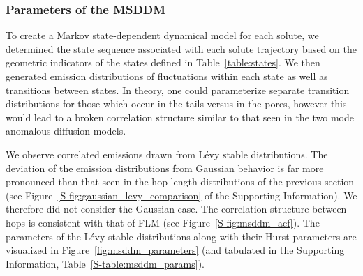 \documentclass[journal=jctcce,manuscript=article]{achemso}
\begin{document}
  \subsubsection{Parameters of the MSDDM}\label{section:msddm_parameterization}

  To create a Markov state-dependent dynamical model for each solute, we determined
  the state sequence associated with each solute trajectory based on the geometric 
  indicators of the states defined in Table~\ref{table:states}. We then generated
  emission distributions of fluctuations within each state as well as transitions 
  between states. In theory, one could parameterize separate transition distributions
  for those which occur in the tails versus in the pores, however this would lead to
  a broken correlation structure similar to that seen in the two mode anomalous
  diffusion models.

  We observe correlated emissions drawn from L\'evy stable distributions. The
  deviation of the emission distributions from Gaussian behavior is far more
  pronounced than that seen in the hop length distributions of the previous
  section (see Figure~\ref{S-fig:gaussian_levy_comparison} of the Supporting
  Information). We therefore did not consider the Gaussian case. The correlation
  structure between hops is consistent with that of FLM (see 
  Figure~\ref{S-fig:msddm_acf}). The parameters of the L\'evy stable distributions
  along with their Hurst parameters are visualized in Figure~\ref{fig:msddm_parameters}
  (and tabulated in the Supporting Information, Table~\ref{S-table:msddm_params}). 
  
\end{document}
